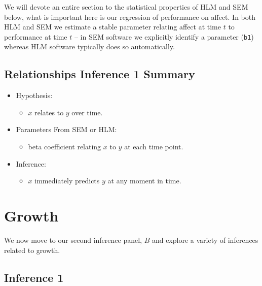 \documentclass[english,,man]{apa6}
\providecommand{\tightlist}{%
  \setlength{\itemsep}{0pt}\setlength{\parskip}{0pt}}
\theoremstyle{definition}
\theoremstyle{definition}
\theoremstyle{definition}
\theoremstyle{remark}
\begin{document}
We will devote an entire section to the statistical properties of HLM
and SEM below, what is important here is our regression of performance
on affect. In both HLM and SEM we estimate a stable parameter relating
affect at time \(t\) to performance at time \(t\) -- in SEM software we
explicitly identify a parameter (\texttt{b1}) whereas HLM software
typically does so automatically.

\hypertarget{relationships-inference-1-summary}{%
\subsection{Relationships Inference 1
Summary}\label{relationships-inference-1-summary}}

\begin{itemize}
\item
  Hypothesis:

  \begin{itemize}
  \tightlist
  \item
    \(x\) relates to \(y\) over time.
  \end{itemize}
\item
  Parameters From SEM or HLM:

  \begin{itemize}
  \tightlist
  \item
    beta coefficient relating \(x\) to \(y\) at each time point.
  \end{itemize}
\item
  Inference:

  \begin{itemize}
  \tightlist
  \item
    \(x\) immediately predicts \(y\) at any moment in time.
  \end{itemize}
\end{itemize}

\hypertarget{growth-1}{%
\section{Growth}\label{growth-1}}

We now move to our second inference panel, \(B\) and explore a variety
of inferences related to growth.

\hypertarget{inference-1-4}{%
\subsection{Inference 1}\label{inference-1-4}}
\end{document}
